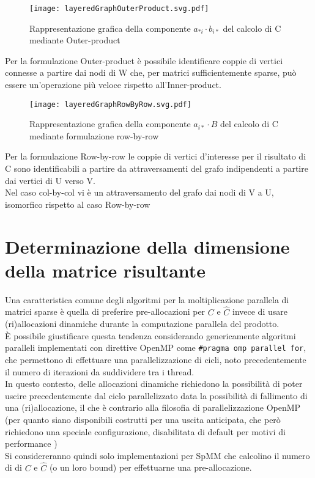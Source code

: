 \begin{figure}[H]
  \centering \texttt{[image: layeredGraphOuterProduct.svg.pdf]} 
  \caption[grafo rappresentativo formulazione Outer-Product]
  {Rappresentazione grafica della componente $a_{*i} \cdot b_{i*}$ del calcolo di C mediante Outer-product}
  \decoRule \label{fig:layeredGraphOuterProduct}
\end{figure}
Per la formulazione Outer-product %
è possibile identificare coppie di vertici connesse a partire dai nodi di W che, per matrici sufficientemente sparse,
può essere un'operazione più veloce rispetto all'Inner-product.\\
\begin{figure}[H]
  \centering \texttt{[image: layeredGraphRowByRow.svg.pdf]} 
  \caption[grafo rappresentativo formulazione Row-by-row]
  {Rappresentazione grafica della componente $a_{i*} \cdot B$ del 
     calcolo di C mediante formulazione row-by-row}
  \decoRule \label{fig:layeredGraphRowByRow}
\end{figure}
Per la formulazione Row-by-row %
le coppie di vertici d'interesse per il risultato di C sono identificabili 
a partire da attraversamenti del grafo indipendenti a partire dai vertici di U verso V.\\
Nel caso col-by-col vi è un attraversamento del grafo dai nodi di V a U, 
isomorfico rispetto al caso Row-by-row\\


\section{Determinazione della dimensione della  matrice risultante} \label{ChExistingTecqs:symbMul}
Una caratteristica comune degli algoritmi per la moltiplicazione parallela di matrici sparse è 
quella di preferire pre-allocazioni per $C$ e $\hat{C}$ 
invece di usare (ri)allocazioni dinamiche durante la computazione parallela del prodotto.\\
È possibile giustificare questa tendenza considerando genericamente algoritmi paralleli implementati con 
\label{ChExistingTecqs:openMP_for_philosophy}
direttive OpenMP come \verb|#pragma omp parallel for|, che permettono di effettuare una 
parallelizzazione di cicli, noto precedentemente il numero di iterazioni da suddividere tra i thread. \\
In questo contesto, delle allocazioni dinamiche richiedono la possibilità di poter uscire precedentemente dal ciclo parallelizzato
data la possibilità di fallimento di una (ri)allocazione, il che è contrario alla filosofia di parallelizzazione OpenMP
(per quanto siano disponibili costrutti per una uscita anticipata, che però richiedono una speciale configurazione, disabilitata di default per 
 motivi di performance \cite{openmp5.1} )\\
Si considereranno quindi solo implementazioni per SpMM che calcolino il numero di \nnz di $C$ e $\hat{C}$ (o un loro bound)
per effettuarne una pre-allocazione.\\

